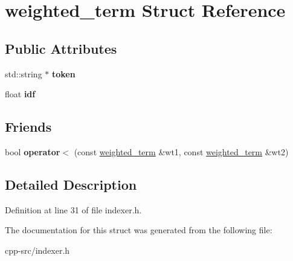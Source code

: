 \hypertarget{structweighted__term}{\section{weighted\-\_\-term Struct Reference}
\label{structweighted__term}
}
\subsection*{Public Attributes}
\begin{DoxyCompactItemize}
\item 
\hypertarget{structweighted__term_a1e94e88216d78d9f4aa290ee86c125d5}{std\-::string $\ast$ {\bfseries token}}\label{structweighted__term_a1e94e88216d78d9f4aa290ee86c125d5}

\item 
\hypertarget{structweighted__term_a5144b866214272d6d1dc480b63612933}{float {\bfseries idf}}\label{structweighted__term_a5144b866214272d6d1dc480b63612933}

\end{DoxyCompactItemize}
\subsection*{Friends}
\begin{DoxyCompactItemize}
\item 
\hypertarget{structweighted__term_ae16d86127836410aa1fec3729b3aa729}{bool {\bfseries operator$<$} (const \hyperlink{structweighted__term}{weighted\-\_\-term} \&wt1, const \hyperlink{structweighted__term}{weighted\-\_\-term} \&wt2)}\label{structweighted__term_ae16d86127836410aa1fec3729b3aa729}

\end{DoxyCompactItemize}


\subsection{Detailed Description}


Definition at line 31 of file indexer.\-h.



The documentation for this struct was generated from the following file\-:\begin{DoxyCompactItemize}
\item 
cpp-\/src/indexer.\-h\end{DoxyCompactItemize}
